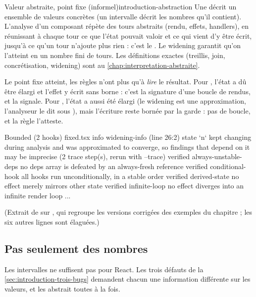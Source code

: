\begin{definition}{Valeur abstraite, point fixe (informel)}{introduction-abstraction}
  Une  décrit un ensemble de valeurs concrètes (un
  intervalle décrit les nombres qu'il contient). L'analyse d'un composant
  répète des tours abstraits (rendu, effets, handlers), en réunissant à chaque
  tour ce que l'état pouvait valoir et ce qui vient d'y être écrit, jusqu'à ce
  qu'un tour n'ajoute plus rien : c'est le . Le widening
  garantit qu'on l'atteint en un nombre fini de tours. Les définitions exactes
  (treillis, join, concrétisation, widening) sont au
  \cref{chap:interpretation-abstraite}.
\end{definition}

Le point fixe atteint, les règles n'ont plus qu'à \emph{lire} le résultat.
Pour , l'état a dû être élargi et l'effet y écrit sans borne :
c'est la signature d'une boucle de rendus, et  la
signale. Pour , l'état a aussi été élargi (le widening est une
approximation, l'analyseur le dit sous ), mais l'écriture reste
bornée par la garde : pas de boucle, et la règle l'atteste.

\begin{sortie}
  Bounded  (2 hooks)  fixed.tsx
    info   widening-info  (line 26:2)  state `n` kept changing during analysis and was approximated to converge, so findings that depend on it may be imprecise
       (2 trace step(s), rerun with --trace)
    verified  always-unstable-deps  no deps array is defeated by an always-fresh reference
    verified  conditional-hook  all hooks run unconditionally, in a stable order
    verified  derived-state  no effect merely mirrors other state
    verified  infinite-loop  no effect diverges into an infinite render loop
    ...
\end{sortie}

(Extrait de  sur
, qui regroupe les versions corrigées des exemples
du chapitre ; les six autres lignes  sont élaguées.)

\subsection{Pas seulement des nombres}

Les intervalles ne suffisent pas pour React. Les trois défauts de la
\cref{sec:introduction-trois-bugs} demandent chacun une information différente
sur les valeurs, et \reactant{} les abstrait toutes à la fois.

